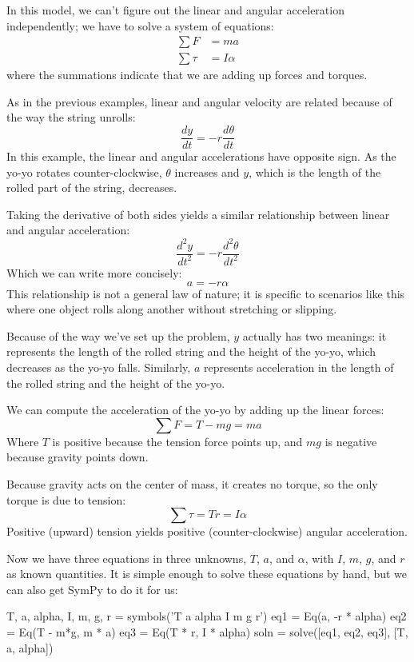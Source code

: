 \documentclass[12pt]{book}
\theoremstyle{exercise}
\begin{document}

In this model, we can't figure out the linear and angular acceleration independently; we have to solve a system of equations:
%
\begin{align*}
\sum F &= m a \\
\sum \tau &= I \alpha
\end{align*}
%
where the summations indicate that we are adding up forces and torques.

As in the previous examples, linear and angular velocity are related because of the way the string unrolls:
%
\[ \frac{dy}{dt} = -r \frac{d \theta}{dt} \]
%
In this example, the linear and angular accelerations have opposite sign.  As the yo-yo rotates counter-clockwise, $\theta$ increases and $y$, which is the length of the rolled part of the string, decreases.

Taking the derivative of both sides yields a similar relationship between linear and angular acceleration:
%
\[ \frac{d^2 y}{dt^2} = -r \frac{d^2 \theta}{dt^2} \]
%
Which we can write more concisely:
%
\[ a = -r \alpha \]
%
This relationship is not a general law of nature; it is specific to scenarios like this where one object rolls along another without stretching or slipping.


Because of the way we've set up the problem, $y$ actually has two meanings: it represents the length of the rolled string and the height of the yo-yo, which decreases as the yo-yo falls.  Similarly, $a$ represents acceleration in the length of the rolled string and the height of the yo-yo.

We can compute the acceleration of the yo-yo by adding up the linear forces:
%
\[ \sum F = T - mg = ma \]
%
Where $T$ is positive because the tension force points up, and $mg$ is negative because gravity points down.

Because gravity acts on the center of mass, it creates no torque, so the only torque is due to tension:
%
\[ \sum \tau = T r = I \alpha \]
%
Positive (upward) tension yields positive (counter-clockwise) angular acceleration.


Now we have three equations in three unknowns, $T$, $a$, and $\alpha$, with $I$, $m$, $g$, and $r$ as known quantities.  It is simple enough to solve these equations by hand, but we can also get SymPy to do it for us:

\begin{python}
T, a, alpha, I, m, g, r = symbols('T a alpha I m g r')
eq1 = Eq(a, -r * alpha)
eq2 = Eq(T - m*g, m * a)
eq3 = Eq(T * r, I * alpha)
soln = solve([eq1, eq2, eq3], [T, a, alpha])
\end{python}
\end{document}
